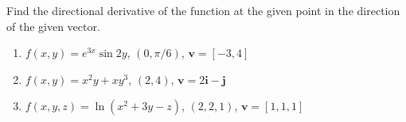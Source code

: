 \begin{Exercise}[title = {Finding Directional Derivatives}, label = direction]
Find the directional derivative of the function at the given point in the 
direction of the given vector. 
\begin{enumerate}
    \item $f(x, y) = e^{3x} \sin{2y}$, $(0, \pi/6)$, $\textbf{v} = \left[ -3, 
    4 \right]$
    \item $f(x, y) = x^2y + xy^3$, $(2, 4)$, $\textbf{v} = 2 \textbf{i} - 
    \textbf{j}$
    \item $f(x, y, z) = \ln{ \left( x^2 + 3y - z \right)}$, $(2, 2, 1)$, 
    $\textbf{v} = \left[ 1, 1, 1 \right]$
\end{enumerate}
\vspace{100mm}
\end{Exercise}

